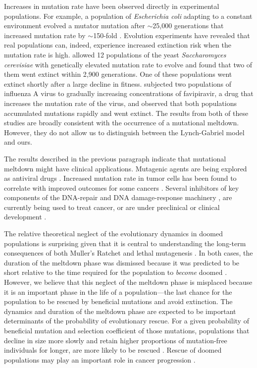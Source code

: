 \documentclass[9pt,lineno]{elife}
\begin{document}
Increases in mutation rate have been observed directly in experimental populations.  For example, a population of \emph{Escherichia coli} adapting to a constant environment evolved a mutator mutation after $\sim$25,000  generations that increased mutation rate by $\sim$150-fold \citep{bar09, wie13}.
%
Evolution experiments have revealed that real populations can, indeed, experience  increased extinction risk when the mutation rate is high.  
%
\citet{zey01a} allowed 12 populations of the yeast \textit{Saccharomyces cerevisiae} with genetically elevated mutation rate to evolve and found that two of them went extinct within 2,900 generations.  One of these populations went extinct shortly after a large decline in fitness.
%
\citet{ban16} subjected two populations of influenza A virus to gradually increasing concentrations of favipiravir, a drug that increases the mutation rate of the virus, and observed that both populations accumulated mutations rapidly and went extinct. 
%
The results from both of these studies are broadly consistent with the occurrence of a mutational meltdown.  However, they do not allow us to distinguish between the Lynch-Gabriel model and ours.

The results described in the previous paragraph indicate that mutational meltdown might have clinical applications.  
%
Mutagenic agents are being explored as antiviral drugs \citep{loe99, cro01, par01, ban16}.
%
Increased mutation rate in tumor cells has been found to correlate with improved outcomes for some cancers \citep{sil00, bir11, and16}.  
%
Several inhibitors of key components of the DNA-repair and DNA damage-response machinery \citep[e.g., PARP inhibitors,][]{lor15}, are currently being used to treat cancer, or are under preclinical or clinical development \citep{bro17}.

The relative theoretical neglect of the evolutionary dynamics in doomed populations is surprising given that it is central to understanding the long-term consequences of both Muller's Ratchet \citep{Lynch_MUTATION_1990,lyn93,Gabriel_MULLER_1993,lyn95} and lethal mutagenesis \citep{Bull_Theory_2007, mat17}.  
%
In both cases, the duration of the meltdown phase was dismissed because it was predicted to be short relative to the time required for the population to \textit{become} doomed \citep{lyn93,lyn95,Bull_Theory_2007}.
%
However, we believe that this neglect of the meltdown phase is misplaced because it
is an important phase in the life of a population---the last chance for the population to be rescued by beneficial mutations and avoid extinction.  The dynamics and duration of the meltdown phase are expected to be important determinants of the probability of evolutionary rescue.  For a given probability of beneficial mutation and selection coefficient of those mutations, populations that decline in size more slowly and retain higher proportions of mutation-free individuals for longer, are more likely to be rescued \citep{mar13}.  
%
Rescue of doomed populations may play an important role in cancer progression \citep{McFarland_Impact_2013, McFarland_Tug_2014}.
\end{document}
